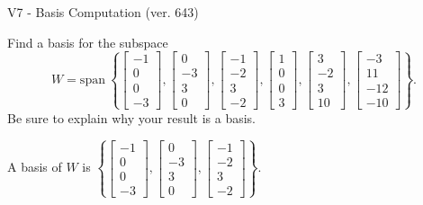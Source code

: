 \begin{exercise}
  \begin{exerciseTitle}V7 - Basis Computation (ver. 643)\end{exerciseTitle}
  \begin{exerciseStatement}
    Find a basis for the subspace 
\[W=\mathrm{span}\ \left\{\left[\begin{array}{r}
-1 \\
0 \\
0 \\
-3
\end{array}\right] , \left[\begin{array}{r}
0 \\
-3 \\
3 \\
0
\end{array}\right] , \left[\begin{array}{r}
-1 \\
-2 \\
3 \\
-2
\end{array}\right] , \left[\begin{array}{r}
1 \\
0 \\
0 \\
3
\end{array}\right] , \left[\begin{array}{r}
3 \\
-2 \\
3 \\
10
\end{array}\right] , \left[\begin{array}{r}
-3 \\
11 \\
-12 \\
-10
\end{array}\right]\right\}.\]
 Be sure to explain why your result is a basis.


  \end{exerciseStatement}
  \begin{exerciseAnswer}
   A basis of \(W\) is  \(\left\{\left[\begin{array}{r}
-1 \\
0 \\
0 \\
-3
\end{array}\right] , \left[\begin{array}{r}
0 \\
-3 \\
3 \\
0
\end{array}\right] , \left[\begin{array}{r}
-1 \\
-2 \\
3 \\
-2
\end{array}\right]\right\}\).
  


  \end{exerciseAnswer}
\end{exercise}